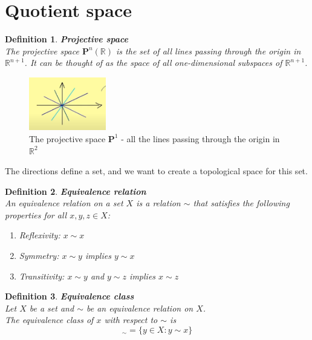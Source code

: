 \documentclass[11pt]{book} %
\newtheorem{definition}{Definition}[section]
\begin{document}
\section{Quotient space}

\begin{definition}{\textbf{Projective space}} \\
    The projective space \( \mathbf{P}^n (\mathbb{R}) \) is the set of all lines passing through the origin in \( \mathbb{R}^{n+1} \).
    It can be thought of as the space of all one-dimensional subspaces of \( \mathbb{R}^{n+1} \).
\end{definition}

\begin{figure}[H]
    \centering
    \includegraphics[width=0.3\textwidth]{Figs/projective_space_2d.png}
    \caption{The projective space \( \mathbf{P}^1 \) - all the lines passing through the origin in \( \mathbb{R}^2 \) }
\end{figure}

The directions define a set, and we want to create a topological space for this set.

\begin{definition}{\textbf{Equivalence relation}} \\
    An equivalence relation on a set \( X \) is a relation \( \sim \) that satisfies the following properties for all \( x, y, z \in X \):
    \begin{enumerate}
        \item Reflexivity: \( x \sim x \)
        \item Symmetry: \( x \sim y \) implies \( y \sim x \)
        \item Transitivity: \( x \sim y \) and \( y \sim z \) implies \( x \sim z \)
    \end{enumerate}
\end{definition}

\begin{definition}{\textbf{Equivalence class}} \\
    Let \( X \) be a set and \( \sim \) be an equivalence relation on \( X \). \\
    The equivalence class of \( x \) with respect to \( \sim \) is
    \begin{equation*}
        [x]_\sim = \{ y \in X : y \sim x \}
    \end{equation*}
\end{definition}
\end{document}
